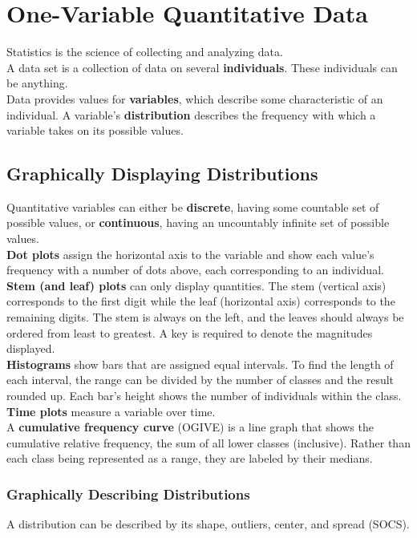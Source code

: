 \documentclass[../AP_Statistics.tex]{subfiles}
\begin{document}
	\chapter{One-Variable Quantitative Data}
		Statistics is the science of collecting and analyzing data. \\
		A data set is a collection of data on several \textbf{individuals}. These individuals can be anything. \\
		Data provides values for \textbf{variables}, which describe some characteristic of an individual.
		A variable's \textbf{distribution} describes the frequency with which a variable takes on its possible values.
		\section{Graphically Displaying Distributions}
			Quantitative variables can either be \textbf{discrete}, having some countable set of possible values, or \textbf{continuous}, having an uncountably infinite set of possible values. \\
			\textbf{Dot plots} assign the horizontal axis to the variable and show each value's frequency with a number of dots above, each corresponding to an individual. \\
			\textbf{Stem (and leaf) plots} can only display quantities. The stem (vertical axis) corresponds to the first digit while the leaf (horizontal axis) corresponds to the remaining digits. The stem is always on the left, and the leaves should always be ordered from least to greatest. A key is required to denote the magnitudes displayed. \\
			\textbf{Histograms} show bars that are assigned equal intervals. To find the length of each interval, the range can be divided by the number of classes and the result rounded up. Each bar's height shows the number of individuals within the class. \\
			\textbf{Time plots} measure a variable over time. \\
			A \textbf{cumulative frequency curve} (OGIVE) is a line graph that shows the cumulative relative frequency, the sum of all lower classes (inclusive). Rather than each class being represented as a range, they are labeled by their medians.
			\subsection*{Graphically Describing Distributions}
				A distribution can be described by its shape, outliers, center, and spread (SOCS).
\end{document}
